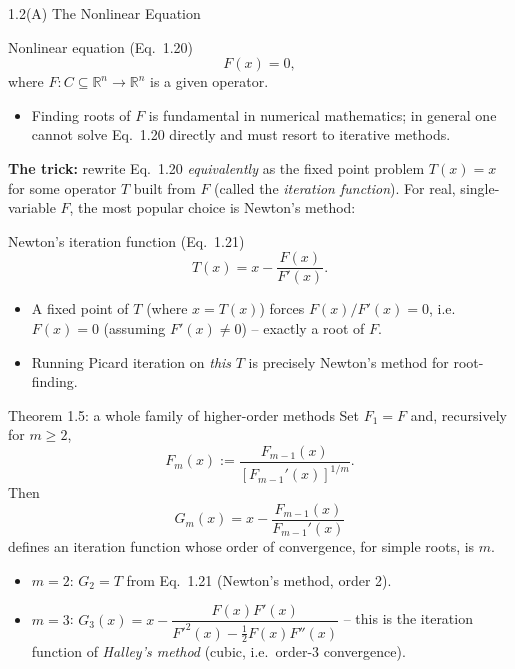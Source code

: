 \documentclass[aspectratio=169,10pt]{beamer}
\newcommand{\R}{\mathbb{R}}
\begin{document}
\begin{frame}[allowframebreaks]{1.2(A) The Nonlinear Equation}

\begin{block}{Nonlinear equation (Eq.\ 1.20)}
\[
  F(x) = 0,
\]
where $F:C\subseteq\R^n\to\R^n$ is a given operator.
\begin{itemize}
  \item Finding roots of $F$ is fundamental in numerical mathematics; in
    general one cannot solve Eq.\ 1.20 directly and must resort to
    iterative methods.
\end{itemize}
\end{block}

\textbf{The trick:} rewrite Eq.\ 1.20 \emph{equivalently} as the fixed
point problem $T(x)=x$ for some operator $T$ built from $F$ (called the
\emph{iteration function}). For real, single-variable $F$, the most
popular choice is Newton's method:

\begin{block}{Newton's iteration function (Eq.\ 1.21)}
\[
  T(x) = x - \frac{F(x)}{F'(x)}.
\]
\begin{itemize}
  \item A fixed point of $T$ (where $x=T(x)$) forces $F(x)/F'(x)=0$, i.e.\
    $F(x)=0$ (assuming $F'(x)\ne 0$) -- exactly a root of $F$.
  \item Running Picard iteration on \emph{this} $T$ is precisely Newton's
    method for root-finding.
\end{itemize}
\end{block}

\framebreak

\begin{block}{Theorem 1.5: a whole family of higher-order methods}
Set $F_1=F$ and, recursively for $m\ge2$,
\[
  F_m(x) := \frac{F_{m-1}(x)}{[F_{m-1}'(x)]^{1/m}}.
\]
Then
\[
  G_m(x) = x - \frac{F_{m-1}(x)}{F_{m-1}'(x)}
\]
defines an iteration function whose order of convergence, for simple
roots, is $m$.
\begin{itemize}
  \item $m=2$: $G_2 = T$ from Eq.\ 1.21 (Newton's method, order 2).
  \item $m=3$: $G_3(x) = x - \dfrac{F(x)F'(x)}{F'^2(x)-\tfrac12 F(x)F''(x)}$
    -- this is the iteration function of \emph{Halley's method} (cubic,
    i.e.\ order-3 convergence).
\end{itemize}
\end{block}

\end{frame}
\end{document}
